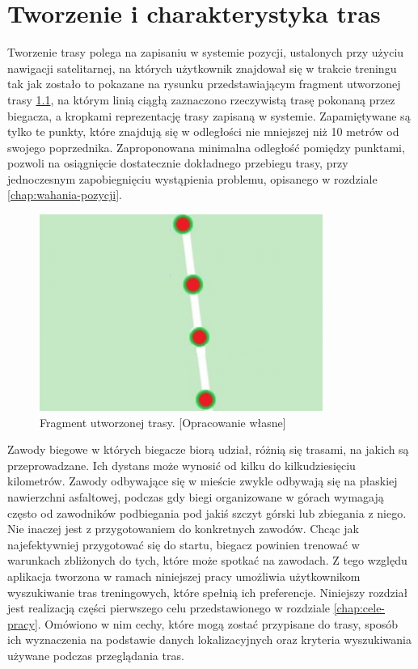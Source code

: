 \chapter{Tworzenie i charakterystyka tras}\label{chap:charakterystyka-tras}
Tworzenie trasy polega na zapisaniu w systemie pozycji, ustalonych przy użyciu nawigacji satelitarnej, na których użytkownik znajdował się w trakcie treningu tak jak zostało to pokazane na rysunku przedstawiającym fragment utworzonej trasy \ref{image:mapka_fragment_trasy}, na którym linią ciągłą zaznaczono rzeczywistą trasę pokonaną przez biegacza, a kropkami reprezentację trasy zapisaną w systemie. Zapamiętywane są tylko te punkty, które znajdują się w odległości nie mniejszej niż 10 metrów od swojego poprzednika. Zaproponowana minimalna odległość pomiędzy punktami, pozwoli na osiągnięcie dostatecznie dokładnego przebiegu trasy, przy jednoczesnym zapobiegnięciu wystąpienia problemu, opisanego w rozdziale \ref{chap:wahania-pozycji}.

\begin{figure}[h]
\begin{center}
\includegraphics{img/mapka_fragment_trasy.png}
\caption{Fragment utworzonej trasy. [Opracowanie własne]}\label{image:mapka_fragment_trasy}
\end{center}
\end{figure}

Zawody biegowe w których biegacze biorą udział, różnią się trasami, na jakich są przeprowadzane. Ich dystans może wynosić od kilku do kilkudziesięciu kilometrów. Zawody odbywające się w mieście zwykle odbywają się na płaskiej nawierzchni asfaltowej, podczas gdy biegi organizowane w górach wymagają często od zawodników podbiegania pod jakiś szczyt górski lub zbiegania z niego. Nie inaczej jest z przygotowaniem do konkretnych zawodów. Chcąc jak najefektywniej przygotować się do startu, biegacz powinien trenować w warunkach zbliżonych do tych, które może spotkać na zawodach. Z tego względu aplikacja tworzona w ramach niniejszej pracy umożliwia użytkownikom wyszukiwanie tras treningowych, które spełnią ich preferencje. Niniejszy rozdział jest realizacją części pierwszego celu przedstawionego w rozdziale \ref{chap:cele-pracy}. Omówiono w nim cechy, które mogą zostać przypisane do trasy, sposób ich wyznaczenia na podstawie danych lokalizacyjnych oraz kryteria wyszukiwania używane podczas przeglądania tras. 
